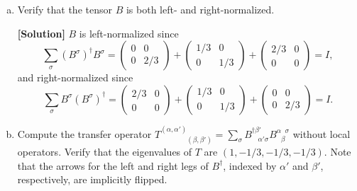 \documentclass[11pt,a4paper,oneside]{article}
\begin{document}
\begin{enumerate}[(a)]

\item
Verify that the tensor $B$ is both left- and right-normalized.

\textbf{[Solution]}
$B$ is left-normalized since
\begin{equation}
\sum_\sigma (B^\sigma)^\dagger B^\sigma  =
\begin{pmatrix}
0 & 0 \\ 0 & 2/3
\end{pmatrix}
+
\begin{pmatrix}
1/3 & 0 \\ 0 & 1/3
\end{pmatrix}
+
\begin{pmatrix}
2/3 & 0 \\ 0 & 0
\end{pmatrix}
= I,
\end{equation}
and right-normalized since
\begin{equation}
\sum_\sigma B^\sigma (B^\sigma)^\dagger =
\begin{pmatrix}
2/3 & 0 \\ 0 & 0
\end{pmatrix}
+
\begin{pmatrix}
1/3 & 0 \\ 0 & 1/3
\end{pmatrix}
+
\begin{pmatrix}
0 & 0 \\ 0 & 2/3
\end{pmatrix}
= I.
\end{equation}


\item
Compute the transfer operator $T^{(\alpha, \alpha')}_{\phantom{(\alpha, \alpha')} (\beta, \beta')} = \sum_{\sigma} B^{\dagger \beta'}_{\phantom{\beta'} \alpha'  \sigma} B^{\alpha \phantom{\beta} \sigma}_{\phantom{\alpha} \beta}$ without local operators.
Verify that the eigenvalues of $T$ are $(1, -1/3, -1/3, -1/3)$.
Note that the arrows for the left and right legs of $B^\dagger$, indexed by $\alpha'$ and $\beta'$, respectively, are implicitly flipped.


\end{enumerate}
\end{document}
